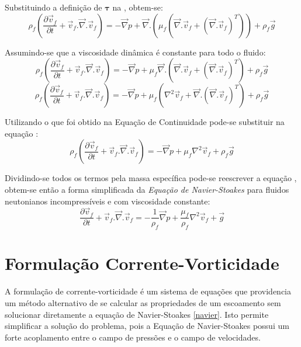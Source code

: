 Substituindo a definição de $\boldsymbol{\tau}$ na , obtem-se:
\begin{equation}
    \rho_f \left(
    	\dfrac{\partial \vec{v}_f}{\partial t} + 
    	\vec{v}_f.\vec{\nabla}.\vec{v}_f
	\right) =
    -\vec{\nabla}p +
    \vec{\nabla}.\left(\mu_f\left(\vec{\nabla}.\vec{v}_f + \left(\vec{\nabla}.\vec{v}_f \right)^T \right)\right) +
    \rho_f \vec{g}
\end{equation}

Assumindo-se que a viscosidade dinâmica é constante para todo o fluido:
\begin{equation}
    \rho_f \left(
    	\dfrac{\partial \vec{v}_f}{\partial t} + 
    	\vec{v}_f.\vec{\nabla}.\vec{v}_f
	\right) =
    -\vec{\nabla}p +
    \mu_f \vec{\nabla}.\left(\vec{\nabla}.\vec{v}_f + \left(\vec{\nabla}.\vec{v}_f \right)^T \right) +
    \rho_f \vec{g}
\end{equation}
\begin{equation}
    \rho_f \left(
    	\dfrac{\partial \vec{v}_f}{\partial t} + 
    	\vec{v}_f.\vec{\nabla}.\vec{v}_f
	\right) =
    -\vec{\nabla}p +
    \mu_f \left(\nabla^2\vec{v}_f + \vec{\nabla}.\left(\vec{\nabla}.\vec{v}_f \right)^T \right) +
    \rho_f \vec{g}
    \label{tau_last}
\end{equation}

Utilizando o que foi obtido na Equação de Continuidade  pode-se substituir na equação :
\begin{equation}
    \rho_f \left(
    	\dfrac{\partial \vec{v}_f}{\partial t} + 
    	\vec{v}_f.\vec{\nabla}.\vec{v}_f
	\right) =
    -\vec{\nabla}p +
    \mu_f \nabla^2\vec{v}_f +
    \rho_f \vec{g}
    \label{tau_simple}
\end{equation}

Dividindo-se todos os termos pela massa específica pode-se reescrever a equação , obtem-se então a forma simplificada da \textit{Equação de Navier-Stoakes} para fluidos neutonianos incompressíveis e com viscosidade constante:
\begin{equation}
	\dfrac{\partial \vec{v}_f}{\partial t} + 
	\vec{v}_f.\vec{\nabla}.\vec{v}_f =
    -\dfrac{1}{\rho_f} \vec{\nabla}p +
    \dfrac{\mu_f}{\rho_f} \nabla^2\vec{v}_f +
    \vec{g}
    \label{navier}
\end{equation}

\section{\textbf{Formulação Corrente-Vorticidade}}
\label{sec_corr_vort}
A formulação de corrente-vorticidade é um sistema de equações que providencia um método alternativo de se calcular as propriedades de um escoamento sem solucionar diretamente a equação de Navier-Stoakes \eqref{navier}.
Isto permite simplificar a solução do problema, pois a Equação de Navier-Stoakes possui um forte acoplamento entre o campo de pressões e o campo de velocidades.

